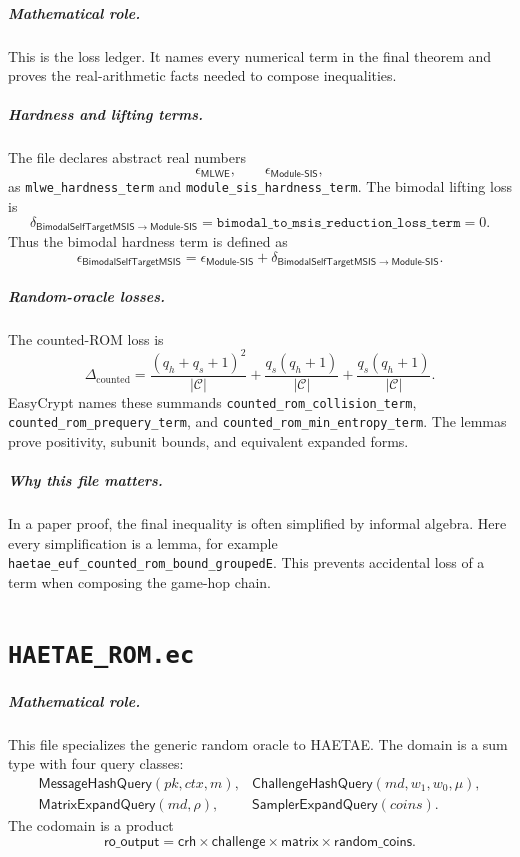 \documentclass[11pt]{report}
\newcommand{\ec}[1]{\nolinkurl{#1}}
\newcommand{\ecchapter}[2]{\chapter{\texorpdfstring{\texttt{#1}}{#2}}}
\newcommand{\MLWE}{\mathsf{MLWE}}
\newcommand{\MSIS}{\mathsf{Module\mbox{-}SIS}}
\newcommand{\BMSIS}{\mathsf{BimodalSelfTargetMSIS}}
\theoremstyle{definition}
\theoremstyle{plain}
\theoremstyle{definition}
\begin{document}
\paragraph{Mathematical role.}
This is the loss ledger.  It names every numerical term in the final theorem
and proves the real-arithmetic facts needed to compose inequalities.

\paragraph{Hardness and lifting terms.}
The file declares abstract real numbers
\[
  \epsilon_{\MLWE},\qquad \epsilon_{\MSIS},
\]
as \ec{mlwe_hardness_term} and \ec{module_sis_hardness_term}.  The bimodal
lifting loss is
\[
  \delta_{\BMSIS\to\MSIS}
  = \texttt{bimodal\_to\_msis\_reduction\_loss\_term}=0.
\]
Thus the bimodal hardness term is defined as
\[
  \epsilon_{\BMSIS}
  = \epsilon_{\MSIS}+\delta_{\BMSIS\to\MSIS}.
\]

\paragraph{Random-oracle losses.}
The counted-ROM loss is
\[
  \Delta_{\mathrm{counted}}
  =
  \frac{(q_h+q_s+1)^2}{|\mathcal{C}|}
  +
  \frac{q_s(q_h+1)}{|\mathcal{C}|}
  +
  \frac{q_s(q_h+1)}{|\mathcal{C}|}.
\]
EasyCrypt names these summands
\ec{counted_rom_collision_term}, \ec{counted_rom_prequery_term}, and
\ec{counted_rom_min_entropy_term}.  The lemmas prove positivity, subunit
bounds, and equivalent expanded forms.

\paragraph{Why this file matters.}
In a paper proof, the final inequality is often simplified by informal algebra.
Here every simplification is a lemma, for example
\ec{haetae_euf_counted_rom_bound_groupedE}.  This prevents accidental loss of a
term when composing the game-hop chain.



\ecchapter{HAETAE\_ROM.ec}{HAETAE ROM.ec}

\paragraph{Mathematical role.}
This file specializes the generic random oracle to HAETAE.  The domain is a
sum type with four query classes:
\[
\begin{array}{ll}
\mathsf{MessageHashQuery}(pk,ctx,m),&
\mathsf{ChallengeHashQuery}(md,w_1,w_0,\mu),\\
\mathsf{MatrixExpandQuery}(md,\rho),&
\mathsf{SamplerExpandQuery}(coins).
\end{array}
\]
The codomain is a product
\[
  \mathsf{ro\_output}
  = \mathsf{crh}\times\mathsf{challenge}\times\mathsf{matrix}\times
    \mathsf{random\_coins}.
\]
\end{document}

